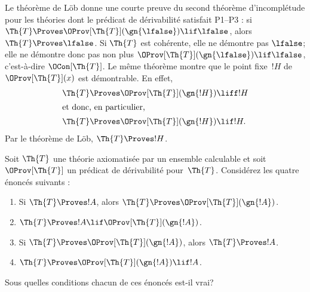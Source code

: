 \documentclass[../../../include/open-logic-section]{subfiles}
\begin{document}
Le théorème de Löb donne une courte preuve du
second théorème d'incomplétude pour les théories
dont le prédicat de dérivabilité satisfait P1--P3 :
si $\Th{T}\Proves
\OProv[\Th{T}](\gn{\lfalse})\lif\lfalse$,
alors $\Th{T}\Proves\lfalse$.
Si $\Th{T}$ est cohérente, elle ne démontre pas
$\lfalse$; elle ne démontre donc pas non plus
$\OProv[\Th{T}](\gn{\lfalse})\lif\lfalse$,
c'est-à-dire $\OCon[\Th{T}]$.
Le même théorème montre que le point fixe~$!H$
de $\OProv[\Th{T}](x)$ est démontrable. En effet,
\begin{align*}
  \Th{T} & \Proves \OProv[\Th{T}](\gn{!H}) \liff !H\\
  \intertext{et donc, en particulier,}
    \Th{T} & \Proves \OProv[\Th{T}](\gn{!H}) \lif !H.
\end{align*}
Par le théorème de Löb, $\Th{T}\Proves !H$.

\begin{prob}
Soit $\Th{T}$ une théorie axiomatisée par un
ensemble calculable et soit $\OProv[\Th{T}]$
un prédicat de dérivabilité pour~$\Th{T}$.
Considérez les quatre énoncés suivants :
\begin{enumerate}
\item Si $\Th{T}\Proves !A$, alors
  $\Th{T}\Proves\OProv[\Th{T}](\gn{!A})$.
\item $\Th{T}\Proves !A\lif
  \OProv[\Th{T}](\gn{!A})$.
\item Si $\Th{T}\Proves
  \OProv[\Th{T}](\gn{!A})$, alors
  $\Th{T}\Proves !A$.
\item $\Th{T}\Proves
  \OProv[\Th{T}](\gn{!A})\lif !A$.
\end{enumerate}
Sous quelles conditions chacun de ces énoncés
est-il vrai?
\end{prob}
\end{document}
